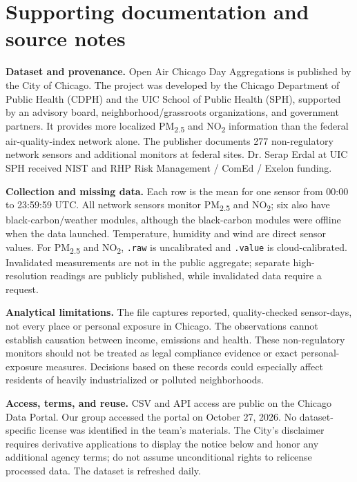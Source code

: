 \documentclass[10pt,letterpaper]{article}
\begin{document}
\clearpage
\pagestyle{plain}
\section*{Supporting documentation and source notes}
\noindent\textbf{Dataset and provenance.} Open Air Chicago Day Aggregations is published by the City of Chicago. The project was developed by the Chicago Department of Public Health (CDPH) and the UIC School of Public Health (SPH), supported by an advisory board, neighborhood/grassroots organizations, and government partners. It provides more localized PM\textsubscript{2.5} and NO\textsubscript{2} information than the federal air-quality-index network alone. The publisher documents 277 non-regulatory network sensors and additional monitors at federal sites. Dr. Serap Erdal at UIC SPH received NIST and RHP Risk Management / ComEd / Exelon funding.\par
\vspace{7pt}
\noindent\textbf{Collection and missing data.} Each row is the mean for one sensor from 00:00 to 23:59:59 UTC. All network sensors monitor PM\textsubscript{2.5} and NO\textsubscript{2}; six also have black-carbon/weather modules, although the black-carbon modules were offline when the data launched. Temperature, humidity and wind are direct sensor values. For PM\textsubscript{2.5} and NO\textsubscript{2}, \texttt{.raw} is uncalibrated and \texttt{.value} is cloud-calibrated. Invalidated measurements are not in the public aggregate; separate high-resolution readings are publicly published, while invalidated data require a request.\par
\vspace{7pt}
\noindent\textbf{Analytical limitations.} The file captures reported, quality-checked sensor-days, not every place or personal exposure in Chicago. The observations cannot establish causation between income, emissions and health. These non-regulatory monitors should not be treated as legal compliance evidence or exact personal-exposure measures. Decisions based on these records could especially affect residents of heavily industrialized or polluted neighborhoods.\par
\vspace{7pt}
\noindent\textbf{Access, terms, and reuse.} CSV and API access are public on the Chicago Data Portal. Our group accessed the portal on October 27, 2026. No dataset-specific license was identified in the team's materials. The City's disclaimer requires derivative applications to display the notice below and honor any additional agency terms; do not assume unconditional rights to relicense processed data. The dataset is refreshed daily.\par
\end{document}
